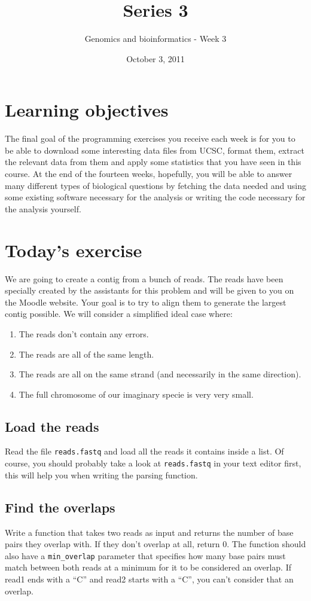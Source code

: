 \documentclass[a4paper,11pt]{article}
\title{Series 3}
\date{October 3, 2011}
\author{Genomics and bioinformatics - Week 3}
\begin{document}
\maketitle

\section{Learning objectives}
The final goal of the programming exercises you receive each week is for you to be able to download some interesting data files from UCSC, format them, extract the relevant data from them and apply some statistics that you have seen in this course. At the end of the fourteen weeks, hopefully, you will be able to answer many different types of biological questions by fetching the data needed and using some existing software necessary for the analysis or writing the code necessary for the analysis yourself.

\section{Today's exercise}
We are going to create a contig from a bunch of reads. The reads have been specially created by the assistants for this problem and will be given to you on the Moodle website. Your goal is to try to align them to generate the largest contig possible. We will consider a simplified ideal case where:
\begin{enumerate}
\item The reads don't contain any errors.
\item The reads are all of the same length.
\item The reads are all on the same strand (and necessarily in the same direction).
\item The full chromosome of our imaginary specie is very very small.
\end{enumerate}
\subsection{Load the reads}
Read the file \texttt{reads.fastq} and load all the reads it contains inside a list. Of course, you should probably take a look at \texttt{reads.fastq} in your text editor first, this will help you when writing the parsing function.
\subsection{Find the overlaps}
Write a function that takes two reads as input and returns the number of base pairs they overlap with. If they don't overlap at all, return 0. The function should also have a \texttt{min\_overlap} parameter that specifies how many base pairs must match between both reads at a minimum for it to be considered an overlap. If read1 ends with a ``C'' and read2 starts with a ``C'', you can't consider that an overlap.
\end{document}
